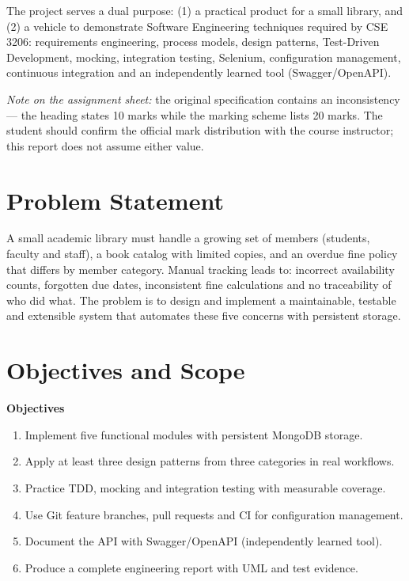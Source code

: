 \documentclass[12pt,a4paper]{article}
\begin{document}
The project serves a dual purpose: (1) a practical product for a small
library, and (2) a vehicle to demonstrate Software Engineering techniques
required by CSE 3206: requirements engineering, process models, design
patterns, Test-Driven Development, mocking, integration testing, Selenium,
configuration management, continuous integration and an independently
learned tool (Swagger/OpenAPI).

\emph{Note on the assignment sheet:} the original specification contains an
inconsistency --- the heading states 10 marks while the marking scheme lists
20 marks. The student should confirm the official mark distribution with the
course instructor; this report does not assume either value.

\section{Problem Statement}
A small academic library must handle a growing set of members (students,
faculty and staff), a book catalog with limited copies, and an overdue fine
policy that differs by member category. Manual tracking leads to:
incorrect availability counts, forgotten due dates, inconsistent fine
calculations and no traceability of who did what. The problem is to design
and implement a maintainable, testable and extensible system that automates
these five concerns with persistent storage.

\section{Objectives and Scope}
\textbf{Objectives}
\begin{enumerate}[leftmargin=1.5em]
  \item Implement five functional modules with persistent MongoDB storage.
  \item Apply at least three design patterns from three categories in real
        workflows.
  \item Practice TDD, mocking and integration testing with measurable coverage.
  \item Use Git feature branches, pull requests and CI for configuration
        management.
  \item Document the API with Swagger/OpenAPI (independently learned tool).
  \item Produce a complete engineering report with UML and test evidence.
\end{enumerate}
\end{document}

